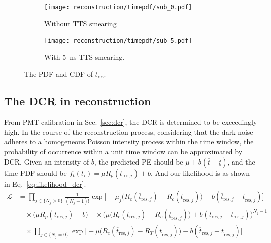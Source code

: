 \begin{figure}[h]
	\centering
	\begin{subfigure}{0.5\textwidth}
		\centering
		\texttt{[image: reconstruction/timepdf/sub\_0.pdf]}
		\caption{Without TTS smearing}
		\label{fig:smear0}
	\end{subfigure}%
	\begin{subfigure}{0.5\textwidth}
		\centering
		\texttt{[image: reconstruction/timepdf/sub\_5.pdf]}
		\caption{With \SI{5}{ns} TTS smearing.}
		\label{fig:smear5}
	\end{subfigure}
	\caption{The PDF and CDF of $t_{\mathrm{res}}$.}
	\label{fig:time}
\end{figure}

\subsection{The DCR in reconstruction}
From PMT calibration in Sec.~\ref{sec:dcr}, the DCR is determined to be exceedingly high. In the course of the reconstruction process, considering that the dark noise adheres to a homogeneous Poisson intensity process within the time window, the probability of occurrence within a unit time window can be approximated by DCR. Given an intensity of $b$, the predicted PE should be $\mu+b(\overline{t}-\underline{t})$, and the time PDF should be $f_t(t_i)=\mu R_p(t_{\mathrm{res},i})+b$. And our likelihood is as shown in Eq.~\eqref{eq:likelihood_dcr}.
\begin{equation}
	\begin{aligned}
		\mathcal{L}
		 & = \prod_{j \in \{N_j>0\}} \frac{1}{(N_j-1)!}
		\exp\Big[ -\mu_j\big(R_c(\overline{t}_{\mathrm{res},j}) - R_c(\underline{t}_{\mathrm{res},j})\big) - b(\overline{t}_{\mathrm{res},j}-\underline{t}_{\mathrm{res},j})\Big]                                          \\
		 & \quad \times \big( \mu R_p(t_{\mathrm{res},j})+b \big)
		\quad \times \Big( \mu \big( R_c(\overline{t}_{\mathrm{res},j}) - R_c(\underline{t}_{\mathrm{res},j}) \big) + b(\overline{t}_{\mathrm{res},j} - t_{\mathrm{res},j}) \Big)^{N_j-1}                                  \\
		 & \quad \times \prod_{j \in \{N_j=0\}} \exp\Big[ -\mu\big(R_c(\overline{t}_{\mathrm{res},j}) - R_T(\underline{t}_{\mathrm{res},j})\big) - b(\overline{t}_{\mathrm{res},j} - \underline{t}_{\mathrm{res},j}) \Big]
	\end{aligned}
	\label{eq:likelihood_dcr}
\end{equation}

